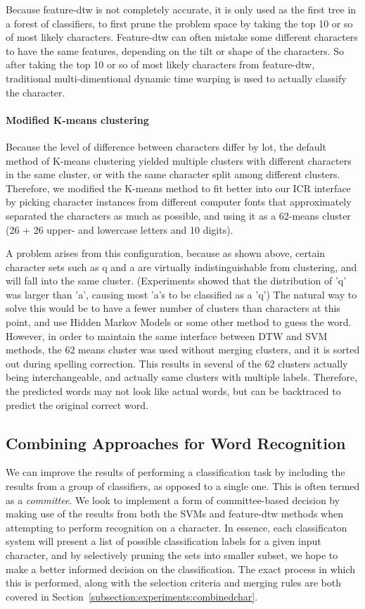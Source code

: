 \documentclass[12pt]{article}
\begin{document}
	Because feature-dtw is not completely accurate, it is only used as the first tree in a forest of classifiers, to first prune the problem space by taking the top 10 or so of most likely characters. Feature-dtw can often mistake some different characters to have the same features, depending on the tilt or shape of the characters. So after taking the top 10 or so of most likely characters from feature-dtw, traditional multi-dimentional dynamic time warping is used to actually classify the character.
	
	\paragraph {Modified K-means clustering} Because the level of difference between characters differ by lot, the default method of K-means clustering yielded multiple clusters with different characters in the same cluster, or with the same character split among different clusters. Therefore, we modified the K-means method to fit better into our ICR interface by picking character instances from different computer fonts that approximately separated the characters as much as possible, and using it as a 62-means cluster (26 + 26 upper- and lowercase letters and 10 digits).
	
	A problem arises from this configuration, because as shown above, certain character sets such as q and a are virtually indistinguishable from clustering, and will fall into the same cluster. (Experiments showed that the distribution of 'q' was larger than 'a', causing most 'a's to be classified as a 'q') The natural way to solve this would be to have a fewer number of clusters than characters at this point, and use Hidden Markov Models or some other method to guess the word. However, in order to maintain the same interface between DTW and SVM methods, the 62 means cluster was used without merging clusters, and it is sorted out during spelling correction. This results in several of the 62 clusters actually being interchangeable, and actually same clusters with multiple labels. Therefore, the predicted words may not look like actual words, but can be backtraced to predict the original correct word.

	\subsection{Combining Approaches for Word Recognition}
	\label{subsection:combined}
	We can improve the results of performing a classification task by including the results from a group of classifiers, as opposed to a single one. This is often termed as a \textit{committee}. We look to implement a form of committee-based decision by making use of the results from both the SVMs and feature-dtw methods when attempting to perform recognition on a character. In essence, each classificaton system will present a list of possible classification labels for a given input character, and by selectively pruning the sets into smaller subset, we hope to make a better informed decision on the classification. The exact process in which this is performed, along with the selection criteria and merging rules are both covered in Section~\ref{subsection:experiments:combinedchar}.
\end{document}
